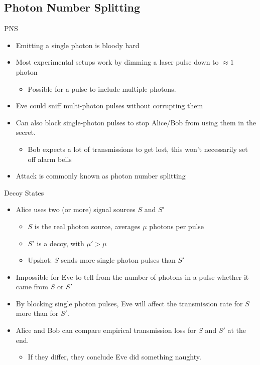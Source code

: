 \documentclass[pdf]{beamer}
\begin{document}
\subsection{Photon Number Splitting}
\begin{frame}{PNS}
  \begin{itemize}
  \item Emitting a single photon is bloody hard
  \item Most experimental setups work by dimming a laser pulse down to
    $\approx 1$ photon
    \begin{itemize}
    \item Possible for a pulse to include multiple photons.
    \end{itemize}
  \item Eve could sniff multi-photon pulses without corrupting them
  \item Can also block single-photon pulses to stop Alice/Bob from using them
    in the secret.
    \begin{itemize}
    \item Bob expects a lot of transmissions to get lost, this won't necessarily
      set off alarm bells
    \end{itemize}
  \item Attack is commonly known as photon number splitting
  \end{itemize}
\end{frame}
\begin{frame}{Decoy States}
  \begin{itemize}
  \item Alice uses two (or more) signal sources $S$ and $S'$
    \begin{itemize}
    \item $S$ is the real photon source, averages $\mu$ photons per pulse
    \item $S'$ is a decoy, with $\mu' > \mu$
    \item Upshot: $S$ sends more single photon pulses than $S'$
    \end{itemize}
  \item Impossible for Eve to tell from the number of photons in a pulse whether
    it came from $S$ or $S'$
  \item By blocking single photon pulses, Eve will affect the transmission rate
    for $S$ more than for $S'$.
  \item Alice and Bob can compare empirical transmission loss for $S$ and $S'$
    at the end.
    \begin{itemize}
    \item If they differ, they conclude Eve did something naughty.
    \end{itemize}
  \end{itemize}
\end{frame}
\end{document}

